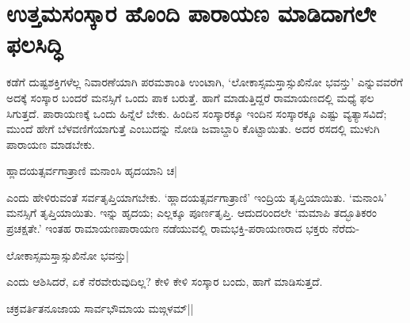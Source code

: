 \section*{ಉತ್ತಮಸಂಸ್ಕಾರ ಹೊಂದಿ ಪಾರಾಯಣ ಮಾಡಿದಾಗಲೇ ಫಲಸಿದ್ಧಿ} 

ಕಡೆಗೆ ದುಷ್ಟಶಕ್ತಿಗಳೆಲ್ಲ ನಿವಾರಣೆಯಾಗಿ ಪರಮಶಾಂತಿ ಉಂಟಾಗಿ, `ಲೋಕಾಸ್ಸಮಸ್ತಾಸ್ಸುಖಿನೋ ಭವನ್ತು' ಎನ್ನುವವರೆಗೆ ಅದಕ್ಕೆ ಸಂಸ್ಕಾರ ಬಂದರೆ ಮನಸ್ಸಿಗೆ ಒಂದು ಪಾಕ ಬರುತ್ತೆ. ಹಾಗೆ ಮಾಡುತ್ತಿದ್ದರೆ ರಾಮಾಯಣದಲ್ಲಿ ಮಧ್ಯೆ ಫಲ ಸಿಗುತ್ತದೆ. ಪಾರಾಯಣಕ್ಕೆ ಒಂದು ಹಿನ್ನೆಲೆ ಬೇಕು. ಹಿಂದಿನ ಸಂಸ್ಕಾರಕ್ಕೂ ಇಂದಿನ ಸಂಸ್ಕಾರಕ್ಕೂ ಎಷ್ಟು ವ್ಯತ್ಯಾಸವಿದೆ; ಮುಂದೆ ಹೇಗೆ ಬೆಳವಣಿಗೆಯಾಗುತ್ತೆ ಎಂಬುದನ್ನು ನೋಡಿ ಜವಾಬ್ದಾರಿ ಕೊಟ್ಟಾಯಿತು. ಅದರ ರಸದಲ್ಲಿ ಮುಳುಗಿ ಪಾರಾಯಣ ಮಾಡಬೇಕು. 

\begin{shloka} 
ಹ್ಲಾದಯತ್ಸರ್ವಗಾತ್ರಾಣಿ ಮನಾಂಸಿ ಹೃದಯಾನಿ ಚ| 
\end{shloka}

ಎಂದು ಹೇಳಿರುವಂತೆ ಸರ್ವತೃಪ್ತಿಯಾಗಬೇಕು. `ಹ್ಲಾದಯತ್ಸರ್ವಗಾತ್ರಾಣಿ' ಇಂದ್ರಿಯ ತೃಪ್ತಿಯಾಯಿತು. `ಮನಾಂಸಿ' ಮನಸ್ಸಿಗೆ ತೃಪ್ತಿಯಾಯಿತು. ಇನ್ನು ಹೃದಯ; ಎಲ್ಲಕ್ಕೂ ಪೂರ್ಣತೃಪ್ತಿ. ಆದುದರಿಂದಲೇ `ಮಮಾಪಿ ತದ್ಭೂತಿಕರಂ ಪ್ರಚಕ್ಷತೇ.'\label{193a} ಇಂತಹ ರಾಮಾಯಣಪಾರಾಯಣ ನಡೆಯುವಲ್ಲಿ ರಾಮಭಕ್ತಿ-ಪರಾಯಣರಾದ ಭಕ್ತರು ನೆರೆದು- 

\begin{shloka} 
ಲೋಕಾಸ್ಸಮಸ್ತಾಸ್ಸುಖಿನೋ ಭವನ್ತು|\label{193b}
\end{shloka}
ಎಂದು ಆಶಿಸಿದರೆ, ಏಕೆ ನೆರವೇರುವುದಿಲ್ಲ? ಕೇಳಿ ಕೇಳಿ ಸಂಸ್ಕಾರ ಬಂದು, ಹಾಗೆ ಮಾಡಿಸುತ್ತದೆ. 

\begin{shloka} 
ಚಕ್ರವರ್ತಿತನೂಜಾಯ ಸಾರ್ವಭೌಮಾಯ ಮಙ್ಗಳಮ್‍||\label{193}
\end{shloka}
